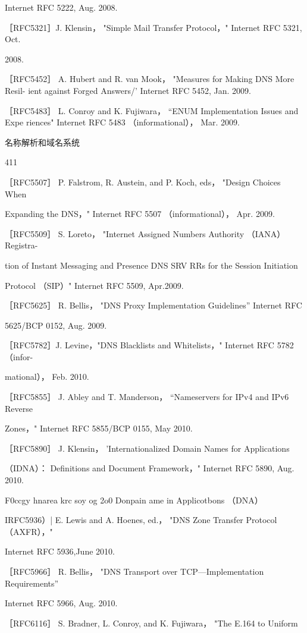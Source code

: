 Internet RFC 5222, Aug. 2008.

［RFC5321］J. Klensin， "Simple Mail Transfer Protocol，" Internet RFC 5321, Oct.

2008.

［RFC5452］ A. Hubert and R. van Mook， "Measures for Making DNS More Resil-
ient against Forged Answers/' Internet RFC 5452, Jan. 2009.

［RFC5483］ L. Conroy and K. Fujiwara， “ENUM Implementation Issues and Expe
riences" Internet RFC 5483 （informational）， Mar. 2009.

名称解析和域名系统

411

［RFC5507］ P. Falstrom, R. Austein, and P. Koch, eds， "Design Choices When

Expanding the DNS，" Internet RFC 5507 （informational）， Apr. 2009.

［RFC5509］ S. Loreto， "Internet Assigned Numbers Authority （IANA） Registra-

tion of Instant Messaging and Presence DNS SRV RRs for the Session Initiation

Protocol （SIP）" Internet RFC 5509, Apr.2009.

［RFC5625］ R. Bellis， "DNS Proxy Implementation Guidelines” Internet RFC

5625/BCP 0152, Aug. 2009.

［RFC5782］J. Levine，"DNS Blacklists and Whitelists，" Internet RFC 5782 （infor-

mational）， Feb. 2010.

［RFC5855］ J. Abley and T. Manderson， “Nameservers for IPv4 and IPv6 Reverse

Zones，" Internet RFC 5855/BCP 0155, May 2010.

［RFC5890］ J. Klensin， 'Internationalized Domain Names for Applications

（IDNA）： Definitions and Document Framework，" Internet RFC 5890, Aug. 2010.

F0ccgy hnarea krc soy og 2o0 Donpain ame in Applicotbons （DNA）

IRFC5936）| E. Lewis and A. Hoenes, ed.， "DNS Zone Transfer Protocol （AXFR），"

Internet RFC 5936,June 2010.

［RFC5966］ R. Bellis， "DNS Transport over TCP—Implementation Requirements”

Internet RFC 5966, Aug. 2010.

［RFC6116］ S. Bradner, L. Conroy, and K. Fujiwara， "The E.164 to Uniform

